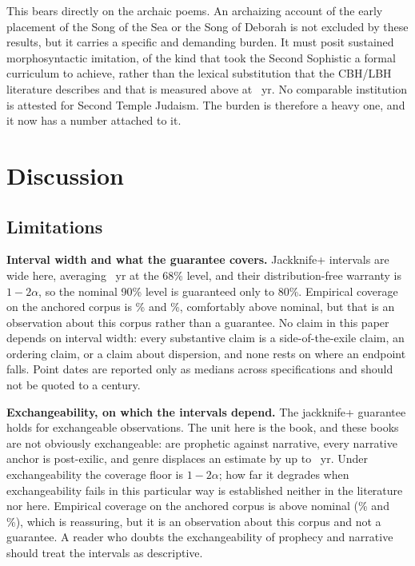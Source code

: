 \documentclass[10pt,letterpaper]{article}
\newcommand{\cbh}{CBH}
\newcommand{\lbh}{LBH}
\begin{document}
This bears directly on the archaic poems.  An archaizing account of the early
placement of the Song of the Sea or the Song of Deborah is not excluded by these
results, but it carries a specific and demanding burden.  It must posit
sustained morphosyntactic imitation, of the kind that took the Second Sophistic
a formal curriculum to achieve, rather than the lexical substitution that the
\cbh{}/\lbh{} literature describes and that is measured above at \arcMeanAbs~yr.
No comparable institution is attested for Second Temple Judaism.  The burden is
therefore a heavy one, and it now has a number attached to it.

\section*{Discussion}

\subsection*{Limitations}

\textbf{Interval width and what the guarantee covers.}  Jackknife+ intervals are
wide here, averaging \jkwidth~yr at the 68\% level, and their distribution-free
warranty is $1-2\alpha$, so the nominal 90\% level is guaranteed only to 80\%.
Empirical coverage on the anchored corpus is \covsixeight\% and \covninety\%,
comfortably above nominal, but that is an observation about this corpus rather
than a guarantee.  No claim in this paper depends on interval width: every substantive
claim is a side-of-the-exile claim, an ordering claim, or a claim about
dispersion, and none rests on where an endpoint falls.  Point dates are
reported only as medians across specifications and should not be quoted to a
century.

\textbf{Exchangeability, on which the intervals depend.}  The jackknife+
guarantee holds for exchangeable observations.  The unit here is the book, and
these \HBbooks{} books are not obviously exchangeable: \GNnProph{} are
prophetic against \GNnNar{} narrative, every narrative anchor is post-exilic,
and genre displaces an estimate by up to \genNarr~yr.  Under exchangeability the coverage floor is $1-2\alpha$; how far it degrades
when exchangeability fails in this particular way is established neither in the
literature nor here.  Empirical coverage on the anchored corpus is above nominal
(\covsixeight\% and \covninety\%), which is reassuring, but it is an observation about
this corpus and not a guarantee.  A reader who doubts the
exchangeability of prophecy and narrative should treat the intervals as
descriptive.
\end{document}
